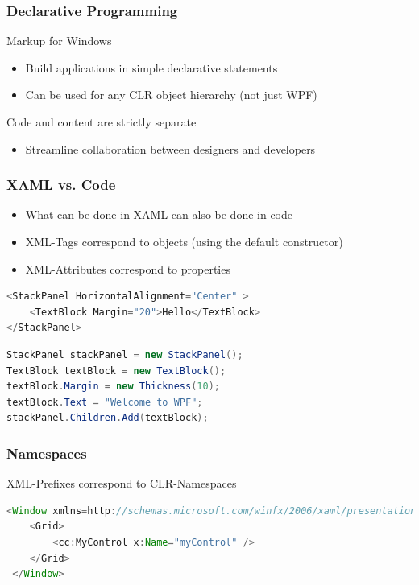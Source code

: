 \documentclass[10pt]{article}
\begin{document}
\subsubsection{Declarative Programming}
Markup for Windows
\begin{itemize}
	\item Build applications in simple declarative statements
	\item Can be used for any CLR object hierarchy (not just WPF)
\end{itemize}
Code and content are strictly separate
\begin{itemize}
	\item Streamline collaboration between designers and developers
\end{itemize}
\subsubsection{XAML vs. Code}
\begin{itemize}
	\item What can be done in XAML can also be done in code
	\item  XML-Tags correspond to objects (using the default constructor)
	\item XML-Attributes correspond to properties
\end{itemize}
\begin{lstlisting}[language=Java, caption=XML, style=JavaStyle]
<StackPanel HorizontalAlignment="Center" >
	<TextBlock Margin="20">Hello</TextBlock>
</StackPanel>
\end{lstlisting}
\begin{lstlisting}[language=Java, caption=C\#, style=JavaStyle]
StackPanel stackPanel = new StackPanel();
TextBlock textBlock = new TextBlock();
textBlock.Margin = new Thickness(10);
textBlock.Text = "Welcome to WPF";
stackPanel.Children.Add(textBlock);
\end{lstlisting}
\subsubsection{Namespaces}
XML-Prefixes correspond to CLR-Namespaces
\begin{lstlisting}[language=Java, caption=Namespaces, style=JavaStyle]
<Window xmlns=http://schemas.microsoft.com/winfx/2006/xaml/presentation xmlns:x="http://schemas.microsoft.com/winfx/2006/xaml" xmlns:cc="clr-namespace:MyCoolControls">
    <Grid>
        <cc:MyControl x:Name="myControl" />
    </Grid>
 </Window>
\end{lstlisting}
\end{document}
